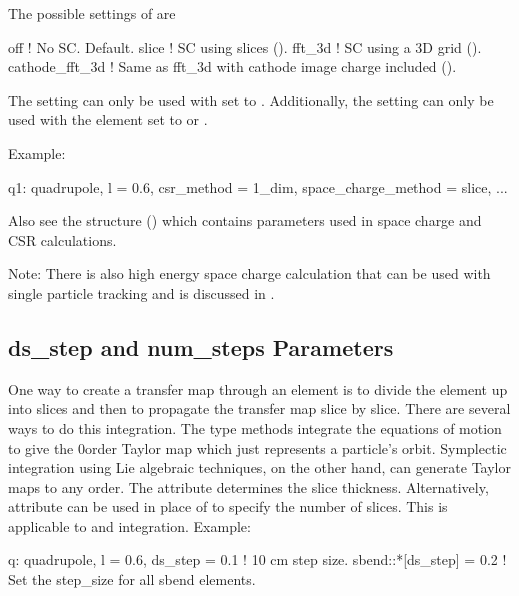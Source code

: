 The possible settings of  are
\begin{example}
  off             ! No SC. Default.
  slice           ! SC using slices ().
  fft_3d          ! SC using a 3D grid ().
  cathode_fft_3d  ! Same as fft_3d with cathode image charge included ().
\end{example}
The  setting can only be used with  set to . Additionally,
the  setting can only be used with the element  set to
 or .

Example:
\begin{example}
  q1: quadrupole, l = 0.6, csr_method = 1_dim, space_charge_method = slice, ...
\end{example}

Also see the  structure () which contains parameters used in
space charge and CSR calculations.

Note: There is also high energy space charge calculation that can be used with single particle
tracking and is discussed in .

\subsection{ds_step and num_steps Parameters}
\label{s:ds.step}

One way to create a transfer map through an element is to divide the element up into slices and then
to propagate the transfer map slice by slice.  There are several ways to do this integration. The
 type methods integrate the equations of motion to give the 0\Th order Taylor map
which just represents a particle's orbit.  Symplectic integration
using Lie algebraic techniques, on the other hand, can generate Taylor maps to any order. The
 attribute determines the slice thickness.  Alternatively,  attribute can
be used in place of  to specify the number of slices.  This is applicable to
 and  integration. Example:
\begin{example}
  q: quadrupole, l = 0.6, ds_step = 0.1  ! 10 cm step size.
  sbend::*[ds_step] = 0.2                ! Set the step_size for all sbend elements.
\end{example}

